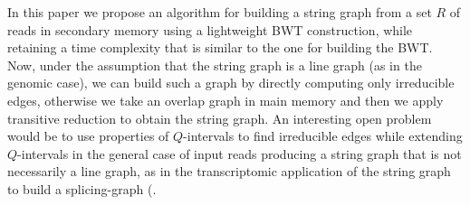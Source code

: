 \documentclass[runningheads,envcountsame,a4paper]{llncs}
\begin{document}
In this paper we propose an algorithm for building a string graph from a set $R$ of reads in secondary memory using a lightweight BWT construction, while retaining
a time complexity that  is similar to the one for building the BWT.
Now, under the assumption that the string graph is a line graph  (as in the genomic case), we can build such a graph by directly computing only irreducible edges, otherwise
we take an overlap graph in main memory and then we apply transitive reduction to obtain the string graph.
An interesting open problem would be to use properties of $Q$-intervals to find irreducible edges while extending $Q$-intervals in the general case of input reads producing a string graph that is not necessarily a line graph, as in the transcriptomic application of the string graph to build a splicing-graph (\cite{Berettaet al}.


\end{document}
